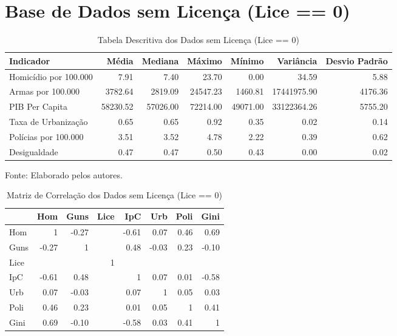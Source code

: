 \documentclass[12pt]{article}
\begin{document}
\section{\textbf{Base de Dados sem Licença (Lice == 0)}}
\begin{table}[H]
\centering
\caption{Tabela Descritiva dos Dados sem Licença (Lice == 0)}
\label{tab:indicadores_sem_licença}
\small
\begin{tabularx}{\textwidth}{l*{6}{R}}
\hline
Indicador & Média & Mediana & Máximo & Mínimo & Variância & Desvio Padrão \\ \hline
Homicídio por 100.000 & 7.91 & 7.40 & 23.70 & 0.00 & 34.59 & 5.88 \\
Armas por 100.000 & 3782.64 & 2819.09 & 24547.23 & 1460.81 & 17441975.90 & 4176.36 \\
PIB Per Capita & 58230.52 & 57026.00 & 72214.00 & 49071.00 & 33122364.26 & 5755.20 \\
Taxa de Urbanização & 0.65 & 0.65 & 0.92 & 0.35 & 0.02 & 0.14 \\
Polícias por 100.000 & 3.51 & 3.52 & 4.78 & 2.22 & 0.39 & 0.62 \\
Desigualdade & 0.47 & 0.47 & 0.50 & 0.43 & 0.00 & 0.02 \\ \hline
\end{tabularx}
\footnotesize{Fonte: Elaborado pelos autores.}
\end{table}

\begin{table}[H]
\centering
\caption{Matriz de Correlação dos Dados sem Licença (Lice == 0)}
\label{tab:correlation_matrix_sem_licença}
\begin{tabular}{lrrrrrrr}
\hline
      & Hom   & Guns  & Lice  & IpC   & Urb   & Poli  & Gini  \\ \hline
Hom   & 1     & -0.27 &       & -0.61 & 0.07  & 0.46  & 0.69  \\
Guns  & -0.27 & 1     &       & 0.48  & -0.03 & 0.23  &-0.10  \\
Lice  &       &       & 1     &       &       &       &       \\
IpC   & -0.61 & 0.48  &       & 1     & 0.07  & 0.01  & -0.58 \\
Urb   & 0.07  & -0.03 &       & 0.07  & 1     & 0.05  & 0.03  \\
Poli  & 0.46  & 0.23  &       & 0.01  & 0.05  & 1     & 0.41  \\
Gini  & 0.69  & -0.10 &       & -0.58 & 0.03  & 0.41  & 1     \\ \hline
\end{tabular}
\end{table}
\end{document}
